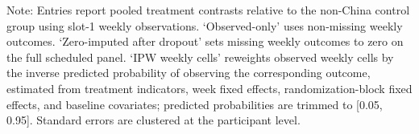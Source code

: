 \begin{table}[H]
\begin{threeparttable}
\begin{tabular}{lllcccc}
\end{tabular}
\begin{tablenotes}[flushleft]
\footnotesize
\item Note: Entries report pooled treatment contrasts relative to the non-China control group using slot-1 weekly observations. `Observed-only' uses non-missing weekly outcomes. `Zero-imputed after dropout' sets missing weekly outcomes to zero on the full scheduled panel. `IPW weekly cells' reweights observed weekly cells by the inverse predicted probability of observing the corresponding outcome, estimated from treatment indicators, week fixed effects, randomization-block fixed effects, and baseline covariates; predicted probabilities are trimmed to [0.05, 0.95]. Standard errors are clustered at the participant level.
\end{tablenotes}
\end{threeparttable}
\end{table}
